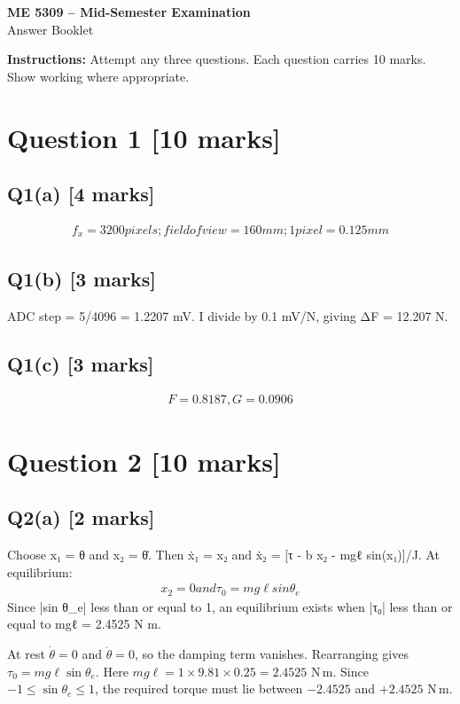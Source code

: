 \documentclass[11pt,a4paper]{article}
\begin{document}
\begin{center}
{\Large\bfseries ME 5309 -- Mid-Semester Examination}\\[3pt]
{\large Answer Booklet}\\[8pt]
\end{center}
\textbf{Instructions:} Attempt any three questions. Each question carries 10 marks. Show working where appropriate.
\section*{Question 1 \hfill [10 marks]}
\subsection*{Q1(a) \hfill [4 marks]}

\[\begin{aligned}f_x = 3200 pixels; field of view = 160 mm; 1 pixel = 0.125 mm\end{aligned}\]

\subsection*{Q1(b) \hfill [3 marks]}

ADC step = 5/4096 = 1.2207 mV.
I divide by 0.1 mV/N, giving ΔF = 12.207 N.

\subsection*{Q1(c) \hfill [3 marks]}

\[\begin{aligned}F = 0.8187, G = 0.0906\end{aligned}\]

\section*{Question 2 \hfill [10 marks]}
\subsection*{Q2(a) \hfill [2 marks]}

Choose x₁ = θ and x₂ = θ̇.
Then ẋ₁ = x₂ and ẋ₂ = [τ - b x₂ - mgℓ sin(x₁)]/J.
At equilibrium:\[\begin{aligned}x_2 = 0 and τ_0 = mg\ell sin \theta_e\end{aligned}\]
Since |sin θ\_e| less than or equal to 1, an equilibrium exists when |τ₀| less than or equal to mgℓ = 2.4525 N m.\par\smallskip At rest $\dot\theta=0$ and $\ddot\theta=0$, so the damping term vanishes. Rearranging gives $\tau_0=mg\ell\sin\theta_e$. Here $mg\ell=1\times9.81\times0.25=2.4525$ N\,m. Since $-1\leq\sin\theta_e\leq1$, the required torque must lie between $-2.4525$ and $+2.4525$ N\,m.
\end{document}
